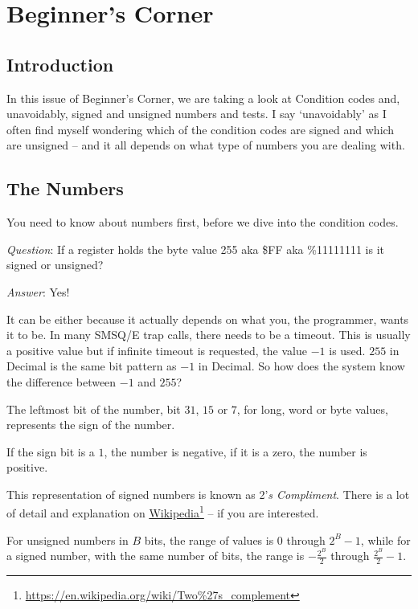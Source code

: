 
\chapter{Beginner's Corner}

\section{Introduction}

In this issue of Beginner's Corner, we are taking a look at Condition
codes and, unavoidably, signed and unsigned numbers and tests. I say
`unavoidably' as I often find myself wondering which of the condition
codes are signed and which are unsigned -- and it all depends on
what type of numbers you are dealing with.

\section{The Numbers}

You need to know about numbers first, before we dive into the condition
codes. 

\emph{Question}: If a register holds the byte value 255 aka \$FF aka \%11111111
is it signed or unsigned?

\emph{Answer}: Yes!

It can be either because it actually depends on what you, the programmer,
wants it to be. In many SMSQ/E trap calls, there needs to be a timeout.
This is usually a positive value but if infinite timeout is requested,
the value $-1$ is used. $255$ in Decimal is the same bit pattern
as $-1$ in Decimal. So how does the system know the difference between
$-1$ and $255$?

The leftmost bit of the number, bit $31$, $15$ or $7$, for long,
word or byte values, represents the sign of the number. 

If the sign bit is a $1$, the number is negative, if it is a zero,
the number is positive. 

This representation of signed numbers is known as 2'\emph{s Compliment}.
There is a lot of detail and explanation on \href{https://en.wikipedia.org/wiki/Two\%27s_complement}{Wikipedia}\footnote{\url{https://en.wikipedia.org/wiki/Two\%27s\_complement}}
-- if you are interested. 

For unsigned numbers in $B$ bits, the range of values is $0$ through
$2^{B}-1$, while for a signed number, with the same number of bits,
the range is $-\frac{2^{B}}{2}$ through $\frac{2^{B}}{2}-1$.

